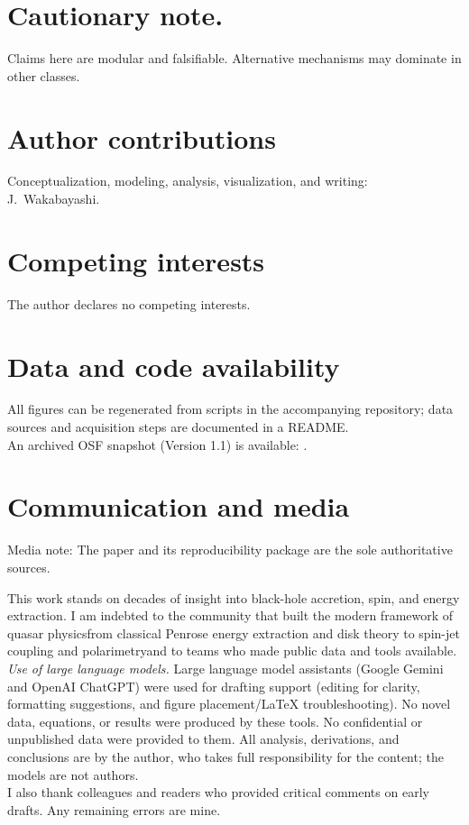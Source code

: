 \documentclass[twocolumn]{aastex701}
\begin{document}
\FloatBarrier
\section*{Cautionary note.}
Claims here are modular and falsifiable. Alternative mechanisms may dominate in other classes.

\section*{Author contributions}
Conceptualization, modeling, analysis, visualization, and writing: J.~Wakabayashi.

\section*{Competing interests}
The author declares no competing interests.

\section*{Data and code availability}
All figures can be regenerated from scripts in the accompanying repository; data sources and acquisition steps are documented in a README.\\
An archived OSF snapshot (Version 1.1) is available: .
\section*{Communication and media}
Media note: The paper and its reproducibility package are the sole authoritative sources.

\begin{acknowledgments}
This work stands on decades of insight into black-hole accretion, spin, and energy extraction. I am indebted to the community that built the modern framework of quasar physics\textemdash{}from classical Penrose energy extraction and disk theory to spin-jet coupling and polarimetry\textemdash{}and to teams who made public data and tools available.
\\[2pt]
\textit{Use of large language models.} Large language model assistants (Google Gemini and OpenAI ChatGPT) were used for drafting support (editing for clarity, formatting suggestions, and figure placement/LaTeX troubleshooting). No novel data, equations, or results were produced by these tools. No confidential or unpublished data were provided to them. All analysis, derivations, and conclusions are by the author, who takes full responsibility for the content; the models are not authors.
\\[2pt]
I also thank colleagues and readers who provided critical comments on early drafts. Any remaining errors are mine.
\end{acknowledgments}


\nocite{*}


\end{document}
